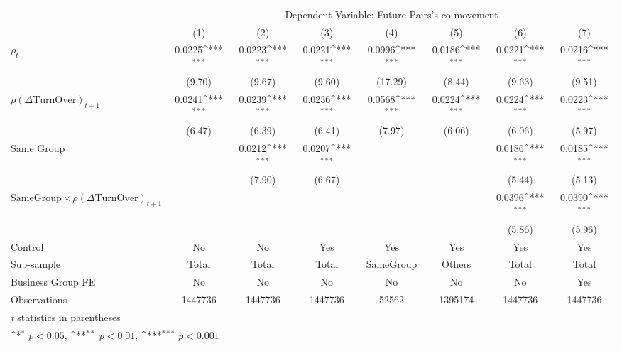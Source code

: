 {
\def\sym#1{\ifmmode^{#1}\else\(^{#1}\)\fi}
\begin{tabular}{l*{7}{c}}
\hline\hline
                &\multicolumn{7}{c}{Dependent Variable: Future Pairs's co-movement}                                                                  \\\cmidrule(lr){2-8}
                &\multicolumn{1}{c}{(1)}         &\multicolumn{1}{c}{(2)}         &\multicolumn{1}{c}{(3)}         &\multicolumn{1}{c}{(4)}         &\multicolumn{1}{c}{(5)}         &\multicolumn{1}{c}{(6)}         &\multicolumn{1}{c}{(7)}         \\
\hline
 $ {\rho_t} $   &   0.0225\sym{***}&   0.0223\sym{***}&   0.0221\sym{***}&   0.0996\sym{***}&   0.0186\sym{***}&   0.0221\sym{***}&   0.0216\sym{***}\\
                &   (9.70)         &   (9.67)         &   (9.60)         &  (17.29)         &   (8.44)         &   (9.63)         &   (9.51)         \\
[1em]
 $ {\rho(\Delta \text{TurnOver})_{t+1}} $ &   0.0241\sym{***}&   0.0239\sym{***}&   0.0236\sym{***}&   0.0568\sym{***}&   0.0224\sym{***}&   0.0224\sym{***}&   0.0223\sym{***}\\
                &   (6.47)         &   (6.39)         &   (6.41)         &   (7.97)         &   (6.06)         &   (6.06)         &   (5.97)         \\
[1em]
Same Group      &                  &   0.0212\sym{***}&   0.0207\sym{***}&                  &                  &   0.0186\sym{***}&   0.0185\sym{***}\\
                &                  &   (7.90)         &   (6.67)         &                  &                  &   (5.44)         &   (5.13)         \\
[1em]
 $ \text{SameGroup} \times {\rho(\Delta \text{TurnOver})_{t+1}} $ &                  &                  &                  &                  &                  &   0.0396\sym{***}&   0.0390\sym{***}\\
                &                  &                  &                  &                  &                  &   (5.86)         &   (5.96)         \\
\hline
Control         &       No         &       No         &      Yes         &      Yes         &      Yes         &      Yes         &      Yes         \\
Sub-sample      &    Total         &    Total         &    Total         &SameGroup         &   Others         &    Total         &    Total         \\
Business Group FE&       No         &       No         &       No         &       No         &       No         &       No         &      Yes         \\
Observations    &  1447736         &  1447736         &  1447736         &    52562         &  1395174         &  1447736         &  1447736         \\
\hline\hline
\multicolumn{8}{l}{\footnotesize \textit{t} statistics in parentheses}\\
\multicolumn{8}{l}{\footnotesize \sym{*} \(p<0.05\), \sym{**} \(p<0.01\), \sym{***} \(p<0.001\)}\\
\end{tabular}
}
